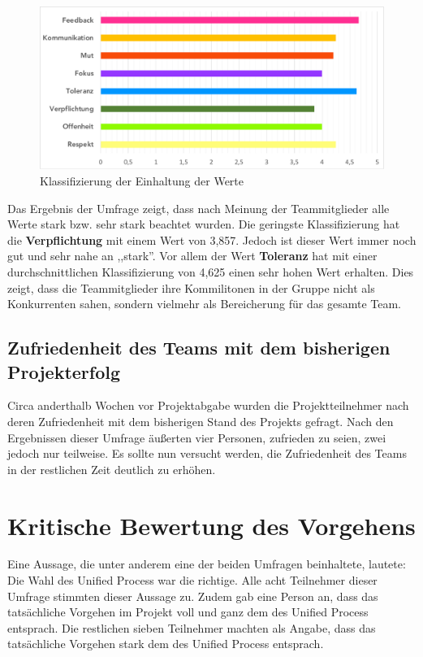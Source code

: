 \documentclass[../review_3.tex]{subfiles}
\begin{document}
\begin{figure} [t]
    \centering
    \includegraphics[width = \linewidth, trim=8pt 8pt 8pt 8pt, clip]{img/werteErg.pdf}
    \caption{Klassifizierung der Einhaltung der Werte}
    \label{werte2}
\end{figure}

Das Ergebnis der Umfrage zeigt, dass nach Meinung der Teammitglieder alle Werte stark bzw. sehr stark beachtet wurden. Die geringste Klassifizierung hat die \textbf{Verpflichtung} mit einem Wert von 3,857. Jedoch ist dieser Wert immer noch gut und sehr nahe an ,,stark''. Vor allem der Wert \textbf{Toleranz} hat mit einer durchschnittlichen Klassifizierung von 4,625 einen sehr hohen Wert erhalten. Dies zeigt, dass die Teammitglieder ihre Kommilitonen in der Gruppe nicht als Konkurrenten sahen, sondern vielmehr als Bereicherung für das gesamte Team.

\subsection{Zufriedenheit des Teams mit dem bisherigen Projekterfolg}
Circa anderthalb Wochen vor Projektabgabe wurden die Projektteilnehmer nach deren Zufriedenheit mit dem bisherigen Stand des Projekts gefragt.
Nach den Ergebnissen dieser Umfrage äußerten vier Personen, zufrieden zu seien, zwei jedoch nur teilweise.
Es sollte nun versucht werden, die Zufriedenheit des Teams in der restlichen Zeit deutlich zu erhöhen.

\section{Kritische Bewertung des Vorgehens}
Eine Aussage, die unter anderem eine der beiden Umfragen beinhaltete, lautete: \glqq Die Wahl des Unified Process war die richtige.\grqq{} Alle acht Teilnehmer dieser Umfrage stimmten dieser Aussage zu. Zudem gab eine Person an, dass das tatsächliche Vorgehen im Projekt voll und ganz dem des Unified Process entsprach. Die restlichen sieben Teilnehmer machten als Angabe, dass das tatsächliche Vorgehen stark dem des Unified Process entsprach.
\end{document}
